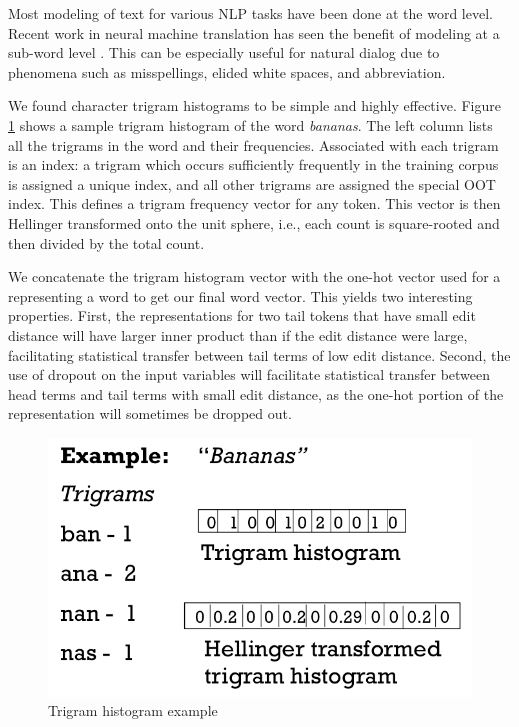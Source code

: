 \documentclass[11pt]{article}
\begin{document}
Most modeling of text for various NLP tasks have been done at the word
level. Recent work in neural machine translation has seen the benefit of modeling at a
sub-word level \cite{DBLP:conf/acl/Costa-JussaF16}. This can be especially
useful for natural dialog due to phenomena such as misspellings, elided
white spaces, and abbreviation.

We found character trigram histograms to be simple and highly effective.
Figure \ref{trigram_histogram} shows a sample trigram histogram of the
word \textit{bananas}. The left column lists all the trigrams in the
word and their frequencies.  Associated with each trigram is an index:
a trigram which occurs sufficiently frequently in the training corpus is
assigned a unique index, and all other trigrams are assigned the special
OOT index.  This defines a trigram frequency vector for any token.
This vector is then Hellinger transformed \cite{legendre2001ecologically} onto the unit sphere,
i.e., each count is square-rooted and then divided by the total count.

We concatenate the trigram histogram vector with the one-hot vector used
for a representing a word to get our final word vector.  This yields
two interesting properties.  First, the representations for two tail
tokens that have small edit distance will have larger inner product
than if the edit distance were large, facilitating statistical transfer
between tail terms of low edit distance.  Second, the use of dropout on
the input variables will facilitate statistical transfer between head
terms and tail terms with small edit distance, as the one-hot portion
of the representation will sometimes be dropped out.

\begin{figure}\label{trigram_histogram}
\includegraphics[scale=0.3]{TrigramHistogram}
\caption{Trigram histogram example}
\end{figure}
\end{document}
